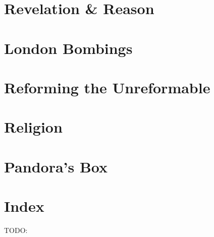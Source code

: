 \documentclass[12pt]{memoir}
\begin{document}
\chapter{Revelation \& Reason}
\chapter{London Bombings}
\chapter{Reforming the Unreformable}
\chapter{Religion}
\chapter{Pandora’s Box}


\backmatter

\chapter{Index}
TODO:
\end{document}
